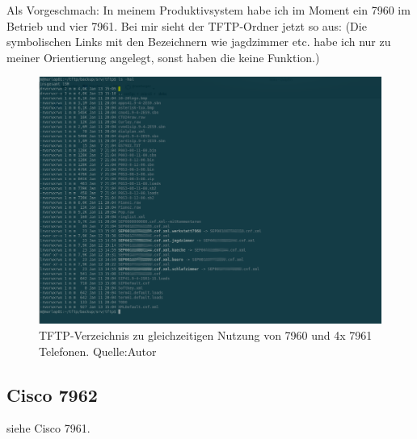 \documentclass[a4paper,12pt]{scrbook}
\begin{document}
Als Vorgeschmach: In meinem Produktivsystem habe ich im Moment ein 7960 im Betrieb und vier 7961. Bei mir sieht der TFTP-Ordner jetzt so aus:
(Die symbolischen Links mit den Bezeichnern wie jagdzimmer etc. habe ich nur zu meiner Orientierung angelegt, sonst haben die keine Funktion.)
\begin{figure}[H]
\begin{center}
\includegraphics[width=1\hsize]{./images/atftpd-cisco7960-7961.png}
\end{center}
\caption[TFTP-Verzeichnis zu gleichzeitigen Nutzung von 7960 und 4x 7961 Telefonen.]
{\label{tftp79607961}TFTP-Verzeichnis zu gleichzeitigen Nutzung von 7960 und 4x 7961 Telefonen. Quelle:Autor}
\end{figure}


\subsection{Cisco 7962}
siehe Cisco 7961.
\end{document}
